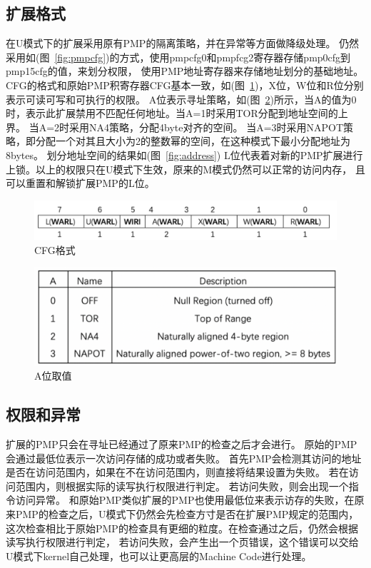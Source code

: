 \subsection{扩展格式}
在U模式下的扩展采用原有PMP的隔离策略，并在异常等方面做降级处理。
仍然采用如(图~\ref{fig:pmpcfg})的方式，使用pmpcfg0和pmpfcg2寄存器存储pmp0cfg到pmp15cfg的值，来划分权限，
使用PMP地址寄存器来存储地址划分的基础地址。
CFG的格式和原始PMP积寄存器CFG基本一致，如(图~\ref{fig:cfgformat})，X位，W位和R位分别表示可读可写和可执行的权限。
A位表示寻址策略，如(图~\ref{fig:afield})所示，当A的值为0时，表示此扩展禁用不匹配任何地址。当A=1时采用TOR分配到地址空间的上界。
当A=2时采用NA4策略，分配4byte对齐的空间。
当A=3时采用NAPOT策略，即分配一个对其且大小为2的整数幂的空间，在这种模式下最小分配地址为8bytes。
划分地址空间的结果如(图~\ref{fig:address})
L位代表着对新的PMP扩展进行上锁。以上的权限只在U模式下生效，原来的M模式仍然可以正常的访问内存，
且可以重置和解锁扩展PMP的L位。
\begin{figure}
    \centering
    \includegraphics[scale=0.30]{Figures/extend/cfgformat.png}
    \decoRule
    \caption{CFG格式}
    \label{fig:cfgformat}
\end{figure}
\begin{figure}
    \centering
    \includegraphics[scale=0.35]{Figures/extend/afield.png}
    \decoRule
    \caption{A位取值}
    \label{fig:afield}
\end{figure}

\subsection{权限和异常}
扩展的PMP只会在寻址已经通过了原来PMP的检查之后才会进行。
原始的PMP会通过最低位表示一次访问存储的成功或者失败。
首先PMP会检测其访问的地址是否在访问范围内，如果在不在访问范围内，则直接将结果设置为失败。
若在访问范围内，则根据实际的读写执行权限进行判定。
若访问失败，则会出现一个指令访问异常。
和原始PMP类似扩展的PMP也使用最低位来表示访存的失败，在原来PMP的检查之后，U模式下仍然会先检查方寸是否在扩展PMP规定的范围内，
这次检查相比于原始PMP的检查具有更细的粒度。在检查通过之后，仍然会根据读写执行权限进行判定，
若访问失败，会产生出一个页错误，这个错误可以交给U模式下kernel自己处理，也可以让更高层的Machine Code进行处理。


